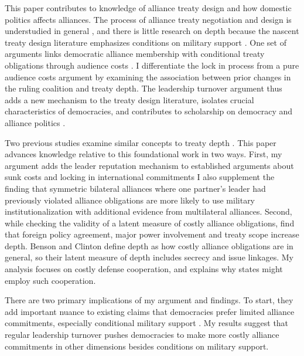 \documentclass[12pt]{article}
\begin{document}
This paper contributes to knowledge of alliance treaty design and how domestic politics affects alliances.
The process of alliance treaty negotiation and design is understudied in general \citep{Poast2019a}, and there is little research on depth because the nascent treaty design literature emphasizes conditions on military support \citep{Kim2011, Benson2012, Mattes2012, Chibaetal2015, FjelstulReiter2019}.
One set of arguments links democratic alliance membership with conditional treaty obligations through audience costs \citep{Mattes2012, Chibaetal2015, FjelstulReiter2019}. 
I differentiate the lock in process from a pure audience costs argument by examining the association between prior changes in the ruling coalition and treaty depth. 
The leadership turnover argument thus adds a new mechanism to the treaty design literature, isolates crucial characteristics of democracies, and contributes to scholarship on democracy and alliance politics \citep{LaiReiter2000, Mattes2012a, McManusYarhi-Milo2017}. 


Two previous studies examine similar concepts to treaty depth \citep{Mattes2012, BensonClinton2016}. 
This paper advances knowledge relative to this foundational work in two ways.  
First, my argument adds the leader reputation mechanism to established arguments about sunk costs and locking in international commitments \citep{Martin2005, SimmonsDanner2010, Mattes2012a} 
I also supplement the finding that symmetric bilateral alliances where one partner's leader had previously violated alliance obligations are more likely to use military institutionalization \citep{Mattes2012} with additional evidence from multilateral alliances.  
Second, while checking the validity of a latent measure of costly alliance obligations, \citet{BensonClinton2016} find that foreign policy agreement, major power involvement and treaty scope increase depth. 
Benson and Clinton define depth as how costly alliance obligations are in general, so their latent measure of depth includes secrecy and issue linkages.
My analysis focuses on costly defense cooperation, and explains why states might employ such cooperation. 


There are two primary implications of my argument and findings. 
To start, they add important nuance to existing claims that democracies prefer limited alliance commitments, especially conditional military support \citep{Mattes2012, Chibaetal2015, FjelstulReiter2019}.
My results suggest that regular leadership turnover pushes democracies to make more costly alliance commitments in other dimensions besides conditions on military support. 
\end{document}

